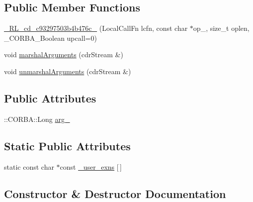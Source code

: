 \subsection*{Public Member Functions}
\begin{DoxyCompactItemize}
\item 
\hyperlink{class__0_r_l__cd__c93297503b4b476c__80000000_ad308c310fa659020a5700f1b678304ed}{\+\_\+R\+L\+\_\+cd\+\_\+c93297503b4b476c\+\_} (Local\+Call\+Fn lcfn, const char $\ast$op\+\_\+, size\+\_\+t oplen, \+\_\+\+C\+O\+R\+B\+A\+\_\+\+Boolean upcall=0)
\item 
void \hyperlink{class__0_r_l__cd__c93297503b4b476c__80000000_a4407e26307e25abe6ac90f6d213a27de}{marshal\+Arguments} (cdr\+Stream \&)
\item 
void \hyperlink{class__0_r_l__cd__c93297503b4b476c__80000000_a676d81c8b60993025cc6aca345e10ef3}{unmarshal\+Arguments} (cdr\+Stream \&)
\end{DoxyCompactItemize}
\subsection*{Public Attributes}
\begin{DoxyCompactItemize}
\item 
\+::C\+O\+R\+B\+A\+::\+Long \hyperlink{class__0_r_l__cd__c93297503b4b476c__80000000_a4c028c6d9f97e31f6f1c2daea15de53d}{arg\+\_}
\end{DoxyCompactItemize}
\subsection*{Static Public Attributes}
\begin{DoxyCompactItemize}
\item 
static const char $\ast$const \hyperlink{class__0_r_l__cd__c93297503b4b476c__80000000_a7f9774a33ed16a3fa01df1cefaf8fcb4}{\+\_\+user\+\_\+exns} \mbox{[}$\,$\mbox{]}
\end{DoxyCompactItemize}


\subsection{Constructor \& Destructor Documentation}
